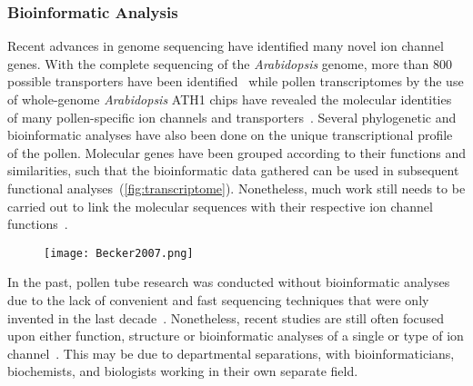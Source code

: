 \documentclass[11pt]{article}
\begin{document}
\begin{multicols*}{2}
\subsubsection{Bioinformatic Analysis}
Recent advances in genome sequencing have identified many novel ion channel genes. With the complete sequencing of the \textit{Arabidopsis} genome, more than 800 possible transporters have been identified~\citep{Arabidopsis2000} while pollen transcriptomes by the use of whole-genome \textit{Arabidopsis} ATH1 chips have revealed the molecular identities of many pollen-specific ion channels and transporters~\citep{Bock2006,Expression2005,Honys2004}. Several phylogenetic and bioinformatic analyses have also been done on the unique transcriptional profile of the pollen. Molecular genes have been grouped according to their functions and similarities, such that the bioinformatic data gathered can be used in subsequent functional analyses~(\autoref{fig:transcriptome}). Nonetheless, much work still needs to be carried out to link the molecular sequences with their respective ion channel functions~\citep{Becker2007,Noir2005}. 
\begin{figure}[H]
  \centering
    \texttt{[image: Becker2007.png]}
  \label{fig:transcriptome}
\end{figure}
In the past, pollen tube research was conducted without bioinformatic analyses due to the lack of convenient and fast sequencing techniques that were only invented in the last decade~\citep{Kircher2010}. Nonetheless, recent studies are still often focused upon either function, structure or bioinformatic analyses of a single or type of ion channel~\citep{Li2008,Liu2006,Marcel2010}. This may be due to departmental separations, with bioinformaticians, biochemists, and biologists working in their own separate field. 
\newline\newline

\end{multicols*}
\end{document}
